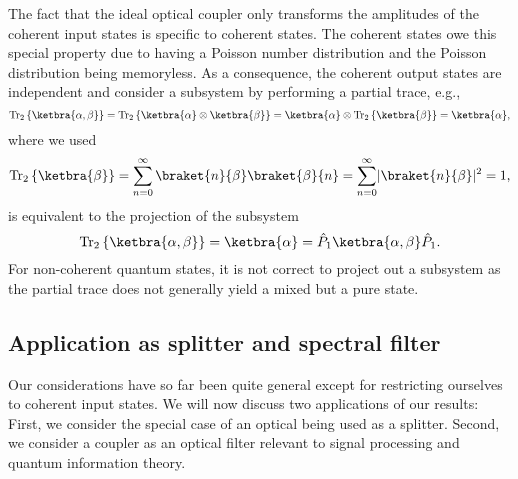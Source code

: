 The fact that the ideal optical coupler only transforms the amplitudes of the coherent input states is specific to coherent states.
The coherent states owe this special property due to having a Poisson number distribution and the Poisson distribution being memoryless.
As a consequence, the coherent output states are independent and consider a subsystem by performing a partial trace, e.g.,
\begin{equation}
	\trace_2\left\{
		\ketbra{\alpha,\beta}
	\right\}
	=
	\trace_2\left\{
		\ketbra{\alpha}
		\otimes
		\ketbra{\beta}
	\right\}
	=
	\ketbra{\alpha}
	\otimes
	\trace_2\left\{
		\ketbra{\beta}
	\right\}
	=
	\ketbra{\alpha}
	,
\end{equation}
where we used
\begin{equation}
	\trace_2\left\{
		\ketbra{\beta}
	\right\}
	=
	\sum_{n=0}^\infty
	\braket{n}{\beta}
	\braket{\beta}{n}
	=
	\sum_{n=0}^\infty
	\abs{\braket{n}{\beta}}^2
	=
	1
	,
\end{equation}
is equivalent to the projection of the subsystem
\begin{equation}
	\trace_2\left\{
		\ketbra{\alpha,\beta}
	\right\}
	=
	\ketbra{\alpha}
	=
	\hat{P}_1
	\ketbra{\alpha,\beta}
	\hat{P}_1
	.
\end{equation}
For non-coherent quantum states, it is not correct to project out a subsystem as the partial trace does not generally yield a mixed but a pure state.

\subsection{Application as splitter and spectral filter}

Our considerations have so far been quite general except for restricting ourselves to coherent input states.
We will now discuss two applications of our results:
First, we consider the special case of an optical being used as a splitter. 
Second, we consider a coupler as an optical filter relevant to signal processing and quantum information theory.

